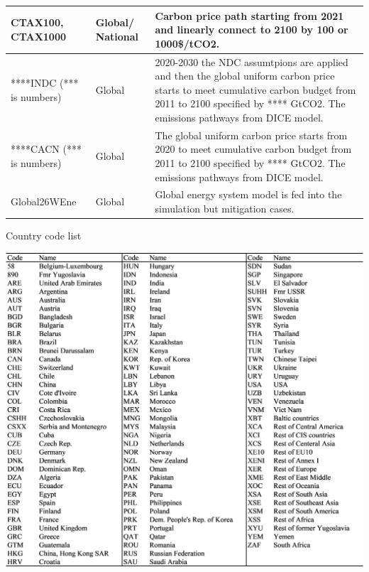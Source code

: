 \documentclass[10pt,a4paper,titlepage,dvipdfmx]{book}
\begin{document}
\begin{tabularx}{\textwidth}{|
p{}|
p{}|
p{}|}
CTAX100, CTAX1000 & Global/ National & Carbon price path starting from 2021 and linearly connect to 2100 by 100 or 1000\$/tCO2.  \\\hline 
****INDC (*** is numbers) & Global & 2020-2030 the NDC assumtpions are applied and then the global uniform carbon price starts to meet cumulative carbon budget from 2011 to 2100 specified by **** GtCO2. The emissions pathways from DICE model. \\\hline 
****CACN (*** is numbers) & Global & The global uniform carbon price starts from 2020 to meet cumulative carbon budget from 2011 to 2100 specified by **** GtCO2. The emissions pathways from DICE model. \\\hline 
Global26WEne & Global & Global energy system model is fed into the simulation but mitigation cases. \\\hline 
\end{tabularx}

\begin{table}
\caption{\label{ref-0078} Country code list}\includegraphics[width=1\textwidth]{fig/image14.png}
\end{table}
 
\end{document}
